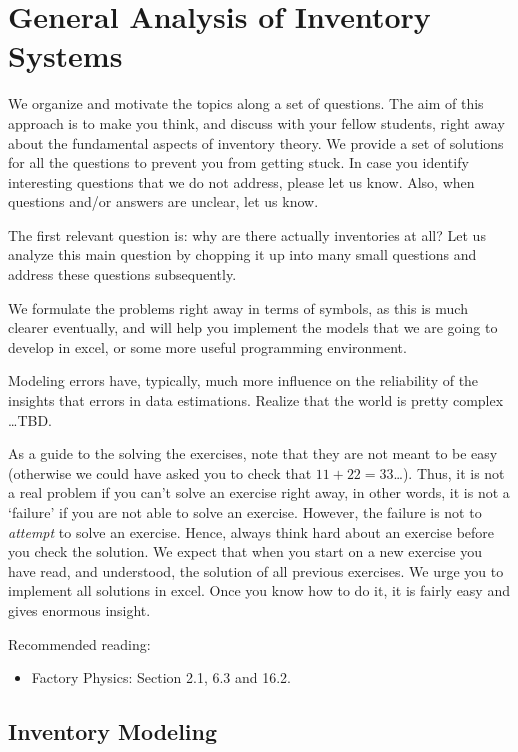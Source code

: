 \section{General Analysis of Inventory Systems}


We organize and motivate the topics along a set of questions.  The aim
of this approach is to make you think, and discuss with your fellow
students, right away about the fundamental aspects of inventory
theory.  We provide a set of solutions for all the questions to
prevent you from getting stuck.  In case you identify interesting
questions that we do not address, please let us know. Also, when
questions and/or answers are unclear, let us know.

The first relevant question is: why are there actually inventories at
all? Let us analyze this main question by chopping it up into many
small questions and address these questions subsequently. 

We formulate the problems right away in terms of symbols, as this is
much clearer eventually, and will help you implement the models that
we are going to develop in excel, or some more useful programming
environment.

Modeling errors have, typically, much more influence on the
reliability of the insights that errors in data estimations. Realize
that the world is pretty complex \ldots TBD.


As a guide to the solving the exercises, note that they are not meant
to be easy (otherwise we could have asked you to check that
$11+22=33$\ldots). Thus, it is not a real problem if you can't solve
an exercise right away, in other words, it is not a `failure' if you
are not able to solve an exercise. However, the failure is not to
\emph{attempt} to solve an exercise. Hence, always think hard about an
exercise before you check the solution.  We expect that when you start
on a new exercise you have read, and understood, the solution of all
previous exercises. We urge you to implement all solutions in
excel. Once you know how to do it, it is fairly easy and gives
enormous insight.



Recommended reading:
\begin{itemize}
\item Factory Physics: Section 2.1, 6.3 and  16.2. 
\end{itemize}

\subsection{Inventory Modeling}
\label{sec:inventory-modeling}

